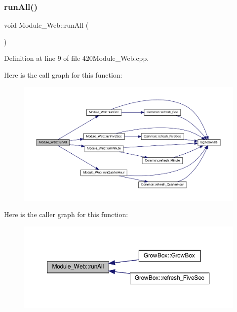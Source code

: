 \subsubsection{\texorpdfstring{run\+All()}{runAll()}\hspace{0.1cm}{\footnotesize\ttfamily [1/2]}}
{\footnotesize\ttfamily void Module\+\_\+\+Web\+::run\+All (\begin{DoxyParamCaption}{ }\end{DoxyParamCaption})}



Definition at line 9 of file 420\+Module\+\_\+\+Web.\+cpp.

Here is the call graph for this function\+:
\nopagebreak
\begin{figure}[H]
\begin{center}
\leavevmode
\includegraphics[width=350pt]{class_module___web_a1aa0d196cbc4ad14f561e1334a0ae98f_cgraph}
\end{center}
\end{figure}
Here is the caller graph for this function\+:
\nopagebreak
\begin{figure}[H]
\begin{center}
\leavevmode
\includegraphics[width=350pt]{class_module___web_a1aa0d196cbc4ad14f561e1334a0ae98f_icgraph}
\end{center}
\end{figure}
\mbox{\label{class_module___web_a1aa0d196cbc4ad14f561e1334a0ae98f}} 
